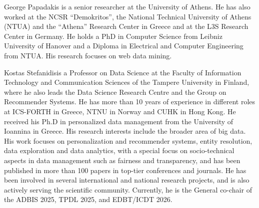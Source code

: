 \documentclass{ieeeaccess}
\begin{document}
\begin{IEEEbiography}
{George Papadakis} is a senior researcher at the University of Athens. He has also worked at the NCSR ``Demokritos'', the National Technical University of Athens (NTUA) and the ``Athena'' Research Center in Greece and at the L3S Research Center in Germany. He holds a PhD in Computer Science from Leibniz University of Hanover and a Diploma in Electrical and Computer Engineering from NTUA. His research focuses on web data mining.
\end{IEEEbiography}
\vspace{-30pt}
\begin{IEEEbiography}{Kostas Stefanidis}is a Professor on Data Science at the Faculty of Information Technology and Communication Sciences of the Tampere University in Finland, where he also leads the Data Science Research Centre and the Group on Recommender Systems. He has more than 10 years of experience in different roles at ICS-FORTH in Greece, NTNU in Norway and CUHK in Hong Kong. He received his Ph.D in personalized data management from the University of Ioannina in Greece. His research interests include the broader area of big data. His work focuses on personalization and recommender systems, entity resolution, data exploration and data analytics, with a special focus on socio-technical aspects in data management such as fairness and transparency, and has been published in more than 100 papers in top-tier conferences and journals. He has been involved in several international and national research projects, and is also actively serving the scientific community. Currently, he is the General co-chair of the ADBIS 2025, TPDL 2025, and EDBT/ICDT 2026.
\end{IEEEbiography}

\EOD
\end{document}
